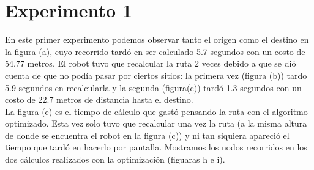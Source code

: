 \begin{figure}[H] %
	\centering
\end{figure}



\newpage




\section{Experimento 1}

En este primer experimento podemos observar tanto el origen como el destino en la figura (a), cuyo recorrido tardó en ser calculado 5.7 segundos con un costo de 54.77 metros. El robot tuvo que recalcular la ruta 2 veces debido a que se dió cuenta de que no podía pasar por ciertos sitios:
la primera vez (figura (b)) tardo 5.9 segundos en recalcularla y la segunda (figura(c)) tardó 1.3 segundos con un costo de 22.7 metros de distancia hasta el destino.\\
La figura (e) es el tiempo de cálculo que gastó pensando la ruta con el algoritmo optimizado. Esta vez solo tuvo que recalcular una vez la ruta (a la misma altura de donde se encuentra el robot en la figura (c)) y ni tan siquiera apareció el tiempo que tardó en hacerlo por pantalla. Mostramos los nodos recorridos en los dos cálculos realizados con la optimización (figuaras h e i).

\begin{figure}[H] %
	\centering
\end{figure}

